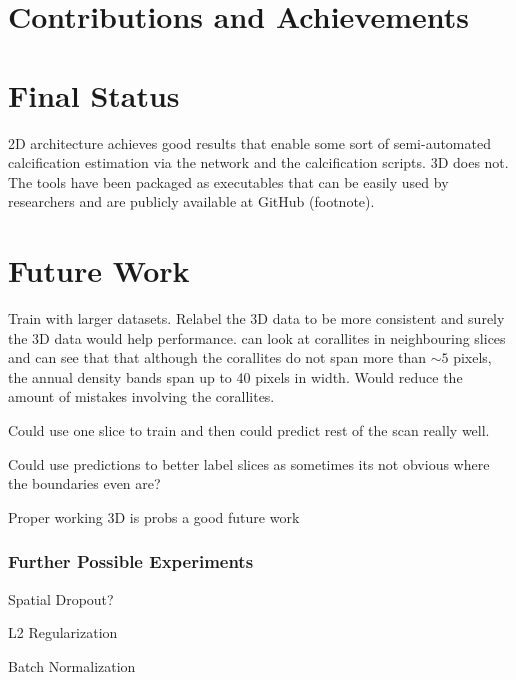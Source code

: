 \section{Contributions and Achievements}

\lipsum[1]
\lipsum[2]
\lipsum[3]

\section{Final Status}

2D architecture achieves good results that enable some sort of semi-automated calcification estimation via the network and the calcification scripts. 3D does not. The tools have been packaged as executables that can be easily used by researchers and are publicly available at GitHub (footnote). 

\lipsum[4]
\lipsum[5]

\section{Future Work}

Train with larger datasets. Relabel the 3D data to be more consistent and surely the 3D data would help performance. can look at corallites in neighbouring slices and can see that that although the corallites do not span more than ${\sim}5$ pixels, the annual density bands span up to 40 pixels in width. Would reduce the amount of mistakes involving the corallites.

Could use one slice to train and then could predict rest of the scan really well.

Could use predictions to better label slices as sometimes its not obvious where the boundaries even are?

Proper working 3D is probs a good future work

\lipsum[6]

\subsubsection{Further Possible Experiments}

Spatial Dropout?

L2 Regularization

Batch Normalization



